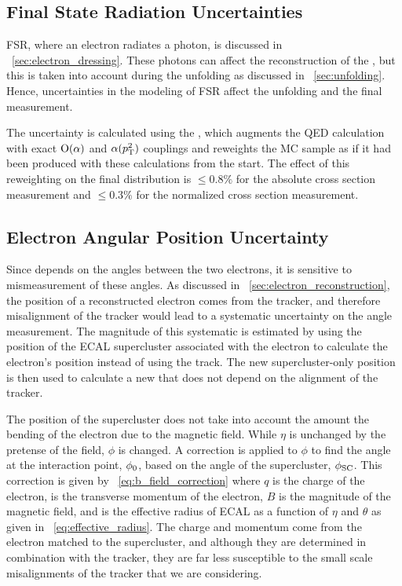 \subsection{Final State Radiation Uncertainties}

FSR, where an electron radiates a photon, is discussed in
\SEC~\ref{sec:electron_dressing}. These photons can affect the reconstruction
of the \Z, but this is taken into account during the unfolding as discussed in
\SEC~\ref{sec:unfolding}. Hence, uncertainties in the modeling of FSR affect
the unfolding and the final measurement.

The uncertainty is calculated using the \FSRWeightProducer, which augments the
\PYTHIA QED calculation with exact $\operatorname{O}\!\left( \alpha \right)$ and $\alpha(p_{\mathrm{T}}^{2})$
couplings and reweights the MC sample as if it had been produced with these
calculations from the start. The effect of this reweighting on the final
\phistar distribution is $\le 0.8\%$ for the absolute cross section measurement
and $\le 0.3\%$ for the normalized cross section measurement.

\subsection{Electron Angular Position Uncertainty}

Since \phistar depends on the angles between the two electrons, it is sensitive
to mismeasurement of these angles. As discussed in
\SEC~\ref{sec:electron_reconstruction}, the position of a reconstructed
electron comes from the tracker, and therefore misalignment of the tracker
would lead to a systematic uncertainty on the angle measurement. The magnitude
of this systematic is estimated by using the position of the ECAL supercluster
associated with the electron to calculate the electron's position instead of
using the track. The new supercluster-only position is then used to calculate a
new \phistarSC that does not depend on the alignment of the tracker.

The position of the supercluster does not take into account the amount the
bending of the electron due to the magnetic field. While $\eta$ is unchanged by
the pretense of the field, $\phi$ is changed. A correction is applied to $\phi$
to find the angle at the interaction point, $\phi_{0}$, based on the angle of
the supercluster, $\phi_{\text{SC}}$. This correction is given by
\EQ~\ref{eq:b_field_correction} where $q$ is the charge of the electron, \pt is
the transverse momentum of the electron, $B$ is the magnitude of the magnetic
field, and \Reffective is the effective radius of ECAL as a function of $\eta$
and $\theta$ as given in \EQ~\ref{eq:effective_radius}. The charge and momentum
come from the electron matched to the supercluster, and although they are
determined in combination with the tracker, they are far less susceptible to
the small scale misalignments of the tracker that we are considering.

